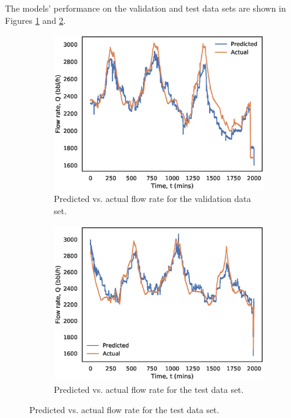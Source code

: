 The models' performance on the validation and test data sets are shown in Figures \ref{fig:08LSValidation} and \ref{fig:08LSTest}.
\begin{figure}[h]
     \centering
     \begin{subfigure}[b]{0.48\textwidth}
         \centering
         \includegraphics[width=\textwidth]{images/suncor/08ls_validation.eps}
         \caption{Predicted vs. actual flow rate for the validation data set.}
         \label{fig:08LSValidation}
     \end{subfigure}
     \hfill
     \begin{subfigure}[b]{0.48\textwidth}
         \centering
         \includegraphics[width=\textwidth]{images/suncor/08ls_test.eps}
         \caption{Predicted vs. actual flow rate for the test data set.}
         \label{fig:08LSTest}
     \end{subfigure}
        \label{fig:08LSPlots}
\end{figure}

